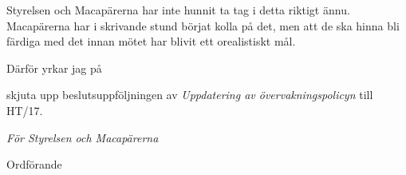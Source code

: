 \documentclass[../_main/handlingar.tex]{subfiles}
\begin{document}

Styrelsen och Macapärerna har inte hunnit ta tag i detta riktigt ännu. Macapärerna har i skrivande stund börjat kolla på det, men att de ska hinna bli färdiga med det innan mötet har blivit ett orealistiskt mål.

Därför yrkar jag på

\begin{attsatser}
    \att skjuta upp beslutsuppföljningen av \emph{Uppdatering av övervakningspolicyn} till HT/17.
\end{attsatser}

\begin{signatures}{1}
    \emph{För Styrelsen och Macapärerna}
    \signature{Erik Månsson}{Ordförande}
\end{signatures}
\end{document}
